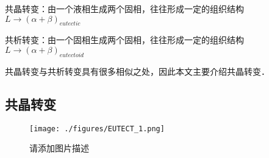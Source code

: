 共晶转变：由一个液相生成两个固相，往往形成一定的组织结构 $L \rightarrow (\alpha+\beta)_{eutectic}$

共析转变：由一个固相生成两个固相，往往形成一定的组织结构 $L \rightarrow (\alpha+\beta)_{eutectoid}$

共晶转变与共析转变具有很多相似之处，因此本文主要介绍共晶转变．

\subsection{共晶转变}
\begin{figure}[ht]
\centering
\texttt{[image: ./figures/EUTECT\_1.png]}
\caption{请添加图片描述} \label{EUTECT_fig1}
\end{figure}